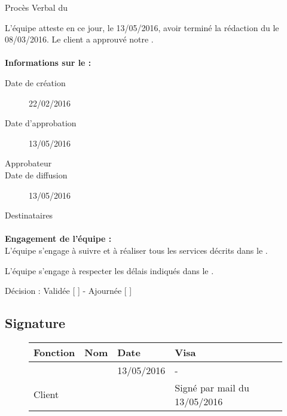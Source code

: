 \documentclass[asi, sansVersion]{picInsa}
\begin{document}
 
 \begin{center}
  \LARGE{}
    Procès Verbal du \DSE \\
 \end{center}
 
 \normalsize{}
 
L'équipe \nomEquipe{} atteste en ce jour, le 13/05/2016, avoir terminé la rédaction du \DSE le 08/03/2016.
Le client a approuvé notre \DSE.


\paragraph{}
\textbf{Informations sur le \DSECourt{} :}

\begin{description}
  \item[Date de création]22/02/2016
  \item[Date d'approbation]13/05/2016
  \item[Approbateur]\nomClient
  \item[Date de diffusion]13/05/2016
  \item[Destinataires]\nomEquipe
\end{description}

\paragraph{}
\textbf{Engagement de l'équipe :}\\


L'équipe \nomEquipe{} s'engage à suivre et à réaliser tous les services décrits dans le \DSE.


L'équipe \nomEquipe{} s'engage à respecter les délais indiqués dans le \DSE.


\begin{center}
Décision : Validée [ \checkmark{} ] - Ajournée [ ]
\end{center}

\subsection*{Signature}
\begin{figure}[H]
		\centering
		\begin{tabularx}{17cm}{|p{4cm}|X|X|X|X|}
		\hline
		\rowcolor[gray]{0.85} Fonction & Nom & Date & Visa \\
		\hline
		\CP{} & \Sergi{} & 13/05/2016 & - \\
		\hline
		Client & \nomClient &  & Signé par mail du 13/05/2016 \\
		\hline
		\end{tabularx}
\end{figure}
\end{document}
